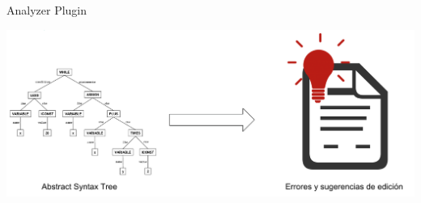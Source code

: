 \documentclass[aspectratio=169,10pt]{beamer}
\begin{document}
\begin{frame}[fragile]{Analyzer Plugin}
		\begin{center}
      \includegraphics[width=1.0\textwidth]{images/plugin.png}
		\end{center}
\end{frame}
\end{document}
